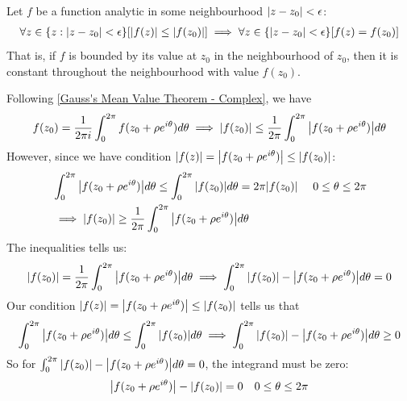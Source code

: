 \documentclass[12pt, english]{book}
\makeatletter
\renewenvironment{proof}[1][\proofname]{\par
	\pushQED{\qed}%
	\normalfont \topsep6\p@\@plus6\p@\relax
	\list{}{%
		\settowidth{\leftmargin}{\itshape\proofname:\hskip\labelsep}%
		\setlength{\labelwidth}{0pt}%
		\setlength{\itemindent}{-\leftmargin}%
	}%
	\item[\hskip\labelsep\itshape#1\@addpunct{:}]\ignorespaces
	}{ \popQED\endlist\@endpefalse}
\makeatother
\begin{document}
	\begin{lemma}
		\label{Analytic function is bounded in neighbourhood implies constant value thoughout neighbourhood Lemma - Complex}
		Let \(f\) be a function analytic in some neighbourhood \(\abs{z-z_0}<\epsilon\):
		\begin{align*}
			\forall z \in \{z : \abs{z-z_0}<\epsilon\}
			[\abs{f(z)} \leq \abs{f(z_0)}] \implies \forall z \in \{\abs{z-z_0}<\epsilon\} [f(z) = f(z_0)]
		\end{align*}
		That is, if \(f\) is bounded by its value at \(z_0\) in the neighbourhood of \(z_0\), then it is constant throughout the neighbourhood with value \(f(z_0)\).
	\end{lemma}
	\begin{proof}
		Following \cref{Gauss's Mean Value Theorem - Complex}, we have 
		\begin{align*}
			f(z_0) = \frac{1}{2\pi i} \int_{0}^{2\pi} f(z_0 + \rho e^{i\theta}) d\theta 
			\implies \abs{f(z_0)} \leq \frac{1}{2\pi} \int_{0}^{2\pi} \abs{f(z_0 + \rho e^{i\theta})} d\theta
		\end{align*}
		However, since we have condition \(\abs{f(z)} =  \abs{f(z_0 + \rho e^{i\theta})} \leq \abs{f(z_0)}\):
		\begin{align*}
			&\int_{0}^{2\pi} \abs{f(z_0 + \rho e^{i\theta })} d \theta 
			 \leq \int_{0}^{2\pi} \abs{f(z_0)} d\theta = 2\pi \abs{f(z_0)} 
			&  \ 0 \leq \theta \leq 2 \pi \\
			&\implies \abs{f(z_0)} \geq \frac{1}{2\pi} \int_{0}^{2\pi} \abs{f(z_0 + \rho e^{i\theta })} d \theta 
		\end{align*}
		The inequalities tells us:
		\begin{align*}
			\abs{f(z_0)} = \frac{1}{2\pi} \int_{0}^{2\pi} \abs{f(z_0 + \rho e^{i\theta})} d\theta 
			\implies \int_{0}^{2\pi} \abs{f(z_0)} - \abs{f(z_0 + \rho e^{i\theta})} d\theta = 0
		\end{align*}
		Our condition \(\abs{f(z)} =  \abs{f(z_0 + \rho e^{i\theta})} \leq \abs{f(z_0)}\) tells us that 
		\begin{align*}
			\int_{0}^{2\pi} \abs{f(z_0 + \rho e^{i\theta})} d\theta \leq \int_{0}^{2\pi} \abs{f(z_0)} d\theta 
			\implies \int_{0}^{2\pi} \abs{f(z_0)} - \abs{f(z_0 + \rho e^{i\theta})} d\theta \geq 0
		\end{align*}
		So for \(\int_{0}^{2\pi} \abs{f(z_0)} - \abs{f(z_0 + \rho e^{i\theta})} d\theta = 0\), the integrand must be zero:
		\begin{align*}
			&\abs{f(z_0 + \rho e^{i\theta})} - \abs{f(z_0)} = 0 & 0\leq \theta \leq 2\pi \\

\end{align*}
\end{proof}
\end{document}
